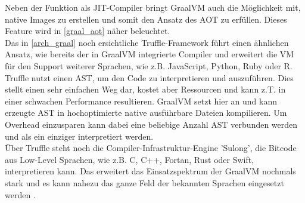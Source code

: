 Neben der Funktion als \ac{JIT}-Compiler bringt GraalVM auch die Möglichkeit mit, native Images zu erstellen und somit den Ansatz des \ac{AOT} zu erfüllen. Dieses Feature wird in \autoref{graal_aot} näher beleuchtet.\\
Das in \autoref{arch_graal} noch ersichtliche Truffle-Framework führt einen ähnlichen Ansatz, wie bereits der in GraalVM integrierte Compiler und erweitert die \ac{VM} für den Support weiterer Sprachen, wie z.B. JavaScript, Python, Ruby oder R. Truffle nutzt einen \ac{AST}, um den Code zu interpretieren und auszuführen. Dies stellt einen sehr einfachen Weg dar, kostet aber Ressourcen und kann z.T. in einer schwachen Performance resultieren. GraalVM setzt hier an und kann erzeugte \ac{AST} in hochoptimierte native ausführbare Dateien kompilieren. Um Overhead einzusparen kann dabei eine beliebige Anzahl \ac{AST} verbunden werden und als ein einziger interpretiert werden.\\
Über Truffle steht noch die Compiler-Infrastruktur-Engine 'Sulong', die Bitcode aus Low-Level Sprachen, wie z.B. C, C++, Fortan, Rust oder Swift, interpretieren kann. Das erweitert das Einsatzspektrum der GraalVM  nochmals stark und es kann nahezu das ganze Feld der bekannten Sprachen eingesetzt werden \cite[vgl. Sipek 2020, S.2]{Sipek_2020}.\\

